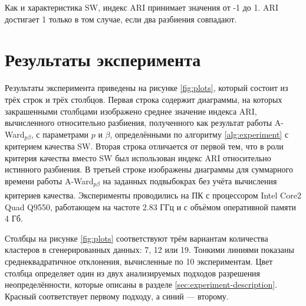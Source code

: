 \documentclass[12pt]{a&t}
\begin{document}
Как и характеристика SW, индекс ARI принимает значения от -1 до 1. ARI достигает 1 только в том случае, если два разбиения совпадают.


\section{Результаты эксперимента}
Результаты эксперимента приведены на рисунке \ref{fig:plots}, который состоит из трёх строк и трёх столбцов. Первая строка содержит диаграммы, на которых закрашенными столбцами изображено среднее значение индекса ARI, вычисленного относительно разбиения, полученного как результат работы \mbox{A-Ward$ _{p\beta} $}, с параметрами $ p $ и $ \beta $, определёнными по алгоритму \ref{alg:experiment} с критерием качества SW. Вторая строка отличается от первой тем, что в роли критерия качества вместо SW был использован индекс ARI относительно истинного разбиения. В третьей строке изображены диаграммы для суммарного времени работы \mbox{A-Ward$ _{p\beta} $} на заданных подвыбокрах без учёта вычисления критериев качества. Эксперименты проводились на ПК с процессором  Intel\textsuperscript{\textregistered} Core\textsuperscript{\texttrademark}2 Quad Q9550, работающем на частоте 2.83 ГГц и с объёмом оперативной памяти 4 Гб.

 Столбцы на рисунке \ref{fig:plots} соответствуют трём вариантам количества кластеров в сгенерированных данных: 7, 12 или 19. Тонкими линиями показаны среднеквадратичное отклонения, вычисленные по 10 экспериментам. Цвет столбца определяет один из двух анализируемых подходов разрешения неопределённости, которые описаны в разделе \ref{sec:experiment-description}. Красный соответствует первому подходу, а синий --- второму.
   
\end{document}
